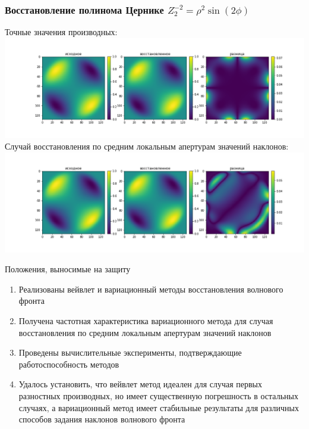\documentclass[11pt]{beamer}
\begin{document}
\begin{frame}
\frametitle{Восстановление полинома Цернике $Z_2^{-2} = \rho^2 \sin(2\phi)$}
Точные значения производных:
\includegraphics[width=1\linewidth]{z_2^-2.png}
\\
Случай восстановления по средним локальным апертурам значений наклонов:
\includegraphics[width=1\linewidth]{z_2^-2_v2.png}


\end{frame}
\begin{frame}{Положения, выносимые на защиту}
\begin{enumerate}
\item Реализованы вейвлет и вариационный методы восстановления волнового фронта
\item Получена частотная характеристика вариационного метода для случая восстановления по средним локальным апертурам значений наклонов
\item Проведены вычислительные эксперименты, подтверждающие работоспособность методов
\item Удалось установить, что вейвлет метод идеален для случая первых разностных производных, но имеет существенную погрешность в остальных случаях, а вариационный метод имеет стабильные результаты для различных способов задания наклонов волнового фронта
\end{enumerate}
\end{frame}
\end{document}
